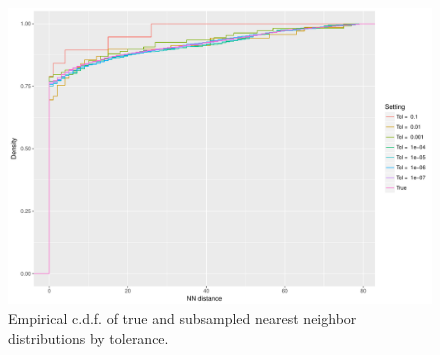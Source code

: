 \documentclass{article}
\begin{document}
\begin{figure}
    \includegraphics[width=\linewidth]{Figures/NearestNeighbor/Sequence/ecdf_by_tol.pdf}
    \caption{Empirical c.d.f. of true and subsampled nearest neighbor distributions by tolerance.}
    \label{fig:NNECDFSequence}
\end{figure}
\end{document}
